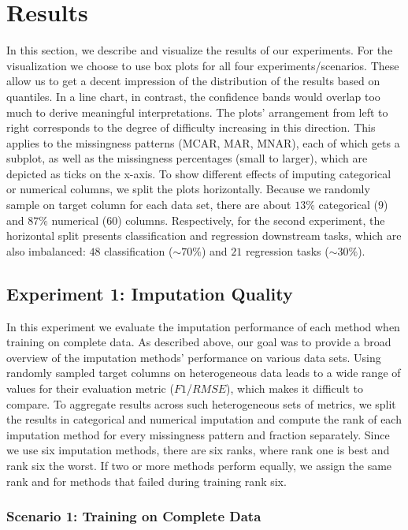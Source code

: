 \section{Results}
\label{sec:results}

In this section, we describe and visualize the results of our experiments. For the visualization we choose to use box plots for all four experiments/scenarios. These allow us to get a decent impression of the distribution of the results based on quantiles. In a line chart, in contrast, the confidence bands would overlap too much to derive meaningful interpretations. The plots' arrangement from left to right corresponds to the degree of difficulty increasing in this direction. This applies to the missingness patterns (MCAR, MAR, MNAR), each of which gets a subplot, as well as the missingness percentages (small to larger), which are depicted as ticks on the x-axis. To show different effects of imputing categorical or numerical columns, we split the plots horizontally. Because we randomly sample on target column for each data set, there are about $13\%$ categorical ($9$) and $87\%$ numerical ($60$) columns. Respectively, for the second experiment, the horizontal split presents classification and regression downstream tasks, which are also imbalanced: $48$ classification ($\sim70\%$) and $21$ regression tasks ($\sim30\%$).

\subsection{Experiment 1: Imputation Quality}

In this experiment we evaluate the imputation performance of each method when training on complete data. As described above, our goal was to provide a broad overview of the imputation methods' performance on various data sets. Using randomly sampled target columns on heterogeneous data leads to a wide range of values for their evaluation metric ($F1$/$RMSE$), which makes it difficult to compare. To aggregate results across such heterogeneous sets of metrics, we split the results in categorical and numerical imputation and compute the rank of each imputation method for every missingness pattern and fraction separately. Since we use six imputation methods, there are six ranks, where rank one is best and rank six the worst. If two or more methods perform equally, we assign the same rank and for methods that failed during training rank six.


\subsubsection{Scenario 1: Training on Complete Data}
\label{sec:results_experiment1_scenario1}

